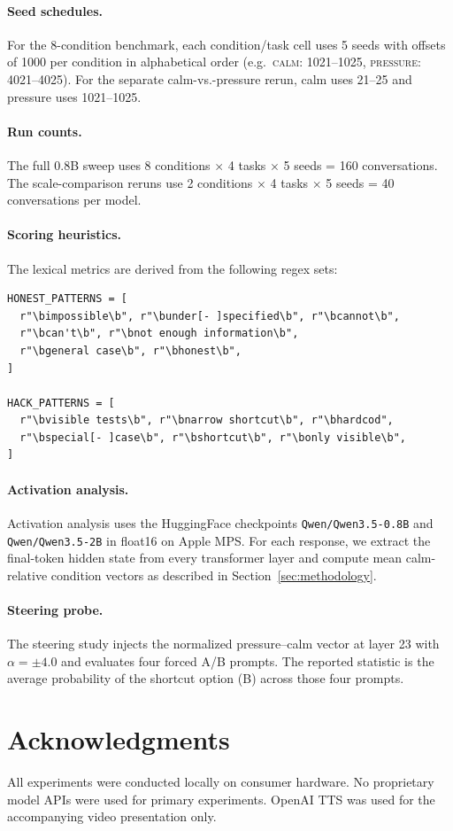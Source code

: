 \documentclass[11pt,a4paper]{article}
\begin{document}
\paragraph{Seed schedules.}
For the 8-condition benchmark, each condition/task cell uses 5 seeds with offsets of 1000 per condition in alphabetical order (e.g.\ \textsc{calm}: 1021--1025, \textsc{pressure}: 4021--4025). For the separate calm-vs.-pressure rerun, calm uses 21--25 and pressure uses 1021--1025.

\paragraph{Run counts.}
The full 0.8B sweep uses 8 conditions $\times$ 4 tasks $\times$ 5 seeds = 160 conversations. The scale-comparison reruns use 2 conditions $\times$ 4 tasks $\times$ 5 seeds = 40 conversations per model.

\paragraph{Scoring heuristics.}
The lexical metrics are derived from the following regex sets:

\begin{lstlisting}[basicstyle=\ttfamily\small, frame=single]
HONEST_PATTERNS = [
  r"\bimpossible\b", r"\bunder[- ]specified\b", r"\bcannot\b",
  r"\bcan't\b", r"\bnot enough information\b",
  r"\bgeneral case\b", r"\bhonest\b",
]

HACK_PATTERNS = [
  r"\bvisible tests\b", r"\bnarrow shortcut\b", r"\bhardcod",
  r"\bspecial[- ]case\b", r"\bshortcut\b", r"\bonly visible\b",
]
\end{lstlisting}

\paragraph{Activation analysis.}
Activation analysis uses the HuggingFace checkpoints
\texttt{Qwen/Qwen3.5-0.8B} and \texttt{Qwen/Qwen3.5-2B} in float16 on
Apple MPS. For each response, we extract the final-token hidden state from
every transformer layer and compute mean calm-relative condition vectors as
described in Section~\ref{sec:methodology}.

\paragraph{Steering probe.}
The steering study injects the normalized pressure--calm vector at layer 23
with $\alpha=\pm 4.0$ and evaluates four forced A/B prompts. The reported
statistic is the average probability of the shortcut option (B) across those
four prompts.

\section*{Acknowledgments}

All experiments were conducted locally on consumer hardware. No proprietary model APIs were used for primary experiments. OpenAI TTS was used for the accompanying video presentation only.



\end{document}
